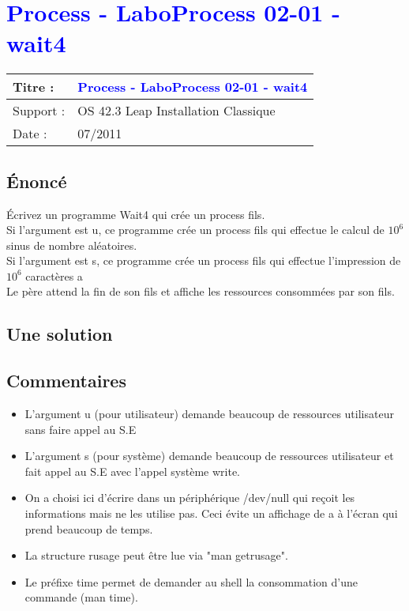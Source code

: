 \lstset{language=c}
\renewcommand{\titre}{\textcolor{blue}{ Process - LaboProcess 02-01 - wait4 }}

\lhead{ \titre }
\section{{\titre} }

\begin{tabular}{|l|l|}
\hline
Titre : 	& \titre \\\hline
Support : 	& OS 42.3 Leap Installation Classique \\\hline
Date :		& 07/2011 \\\hline
\end{tabular}

\subsection{Énoncé}

Écrivez un programme Wait4 qui crée un process fils. \\
Si l'argument est u, ce programme crée un process fils qui effectue le calcul de $10^6$ sinus de nombre aléatoires.\\
Si l'argument est s, ce programme crée un process fils qui effectue l'impression de $10^6$ caractères a\\
Le père attend la fin de son fils et affiche les ressources consommées par son fils.

\subsection{Une solution}



\subsection{Commentaires}

\begin{itemize}
\item L'argument u (pour utilisateur) demande beaucoup de ressources utilisateur sans faire appel au S.E 
\item L'argument s (pour système) demande beaucoup de ressources utilisateur et fait appel au S.E avec l'appel système write.
\item On a choisi ici d'écrire dans un périphérique /dev/null qui reçoit les informations mais ne les utilise pas. Ceci évite un affichage de a à l'écran qui prend beaucoup de temps.
\item La structure rusage peut être lue via "man getrusage".
\item Le préfixe time permet de demander au shell la consommation d'une commande (man time).
\end{itemize}
\newpage
